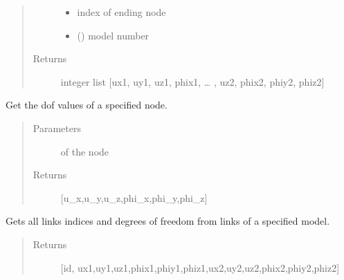 \documentclass[letterpaper,10pt,english]{sphinxmanual}
\begin{document}
\begin{fulllineitems}
\begin{fulllineitems}
\begin{quote}
\begin{description}
\begin{itemize}
\item {} 
 \textendash{} index of ending node

\item {} 
 () \textendash{} model number

\end{itemize}

\item[{Returns}] \leavevmode
integer list {[}ux1, uy1, uz1, phix1, … , uz2, phix2, phiy2, phiz2{]}

\end{description}\end{quote}

\end{fulllineitems}


\begin{fulllineitems}
\label{\detokenize{api:beamon.database.database.Database.get_dof}}
Get the dof values of a specified node.
\begin{quote}\begin{description}
\item[{Parameters}] \leavevmode
{} \textendash{} of the node

\item[{Returns}] \leavevmode
{[}u\_x,u\_y,u\_z,phi\_x,phi\_y,phi\_z{]}

\end{description}\end{quote}

\end{fulllineitems}


\begin{fulllineitems}
\label{\detokenize{api:beamon.database.database.Database.get_edof}}
Gets all links indices and degrees of freedom from links of a specified model.
\begin{quote}\begin{description}
\item[{Returns}] \leavevmode
{[}id, ux1,uy1,uz1,phix1,phiy1,phiz1,ux2,uy2,uz2,phix2,phiy2,phiz2{]}


\end{description}
\end{quote}
\end{fulllineitems}
\end{fulllineitems}
\end{document}
